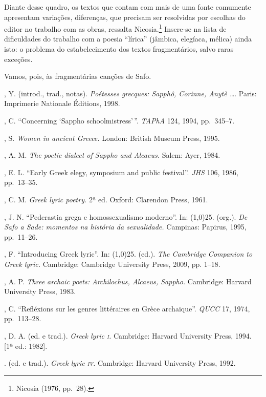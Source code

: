Diante desse quadro, os textos que contam com mais de uma fonte comumente
apresentam variações, diferenças, que precisam ser resolvidas por escolhas do
editor no trabalho com as obras, ressalta Nicosia.\footnote{ Nicosia (1976, pp.~28).} Insere-se na lista
de dificuldades do trabalho com a poesia “lírica” (jâmbica, elegíaca, mélica)
ainda isto: o problema do estabelecimento dos textos fragmentários, salvo raras
exceções. 

Vamos, pois, às fragmentárias canções de Safo.


\begin{bibliohedra}
\EP[]

, Y. (introd., trad., notas). \textit{Poétesses grecques:
Sapphô, Corinne, Anytè \ldots{}}. Paris: Imprimerie Nationale Éditions, 1998.

, C. “Concerning ‘Sappho schoolmistress’\,”. \textit{TAPhA} 124,
1994, pp.~345--7.

, S. \textit{Women in ancient Greece.} London: British Museum
Press, 1995.

, A. M. \textit{The poetic dialect of Sappho and Alcaeus.} Salem:
Ayer, 1984. 

, E. L. “Early Greek elegy, symposium and public festival”.
\textit{JHS} 106, 1986, pp.~13--35.

, C. M. \textit{Greek lyric poetry.} 2ª
ed. Oxford: Clarendon Press, 1961.

, J. N. “Pederastia grega e homossexualismo moderno”. In:
\line(1,0){25}. (org.). \textit{De Safo a Sade: momentos na história da
sexualidade.} Campinas: Papirus, 1995, pp.~11--26.

, F. “Introducing Greek lyric”. In:
\line(1,0){25}. (ed.). \textit{The Cambridge
Companion to Greek lyric.} Cambridge: Cambridge University Press, 2009, pp.
1--18.

, A. P. \textit{Three archaic poets: Archilochus, Alcaeus,
Sappho.} Cambridge: Harvard University Press, 1983. 

, C. “Refléxions sur les genres littéraires en Grèce archaïque”.
\textit{QUCC} 17, 1974, pp.~113--28.

, D. A. (ed. e trad.). \textit{Greek lyric \textsc{i}.} Cambridge:
Harvard University Press, 1994. [1ª ed.: 1982].

\titidem. (ed. e trad.). \textit{Greek lyric \textsc{iv}.} Cambridge: Harvard
University Press, 1992.


\end{bibliohedra}
